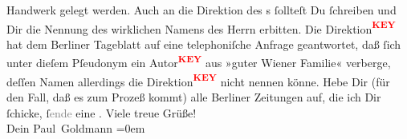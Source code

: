 \begin{ledgroupsized}[t]{13cm}
                    Handwerk gelegt werden. Auch an die {\pb}Direktion
                    des \label{K_L03205-6v}\label{K_L03205-6h}s ſollteſt Du ſchreiben und Dir die Nennung
                    des wirklichen Namens des Herrn \label{K_L03205-7v}\label{K_L03205-7h} erbitten. Die Direktion\textcolor{red}{\textsuperscript{\textbf{KEY}}} hat dem Berliner
                        Tageblatt\strikeout{\textcolor{gray}{×}} auf eine
                    telephoniſche Anfrage geantwortet, daß  ſich
                         unter dieſem Pſeudonym ein Autor\textcolor{red}{\textsuperscript{\textbf{KEY}}} aus »guter Wiener Familie« verberge, deſſen Namen allerdings die Direktion\textcolor{red}{\textsuperscript{\textbf{KEY}}} nicht nennen könne.\pend
           \pstart
           Hebe Dir (für den Fall, daß es zum Prozeß kommt) alle Berliner Zeitungen auf, die ich Dir ſchicke,
                        ſ\textcolor{gray}{ende} eine \label{K_L03205-8v}\label{K_L03205-8h}.\pend
           \pstart
           Viele treue Grüße! {\\[\baselineskip]}Dein \spacefill\mbox{Paul Goldmann}\pend
           \leftskip=0em{}
         
         \endnumbering{}\end{ledgroupsized}\begin{anhang}\end{anhang}\newcommand{\dateiname}{L03205}\newcommand{\titel}{Paul Goldmann an Arthur Schnitzler, 29. 4. [1902]}\newcommand{\editorInnen}{Martin Anton Müller und Laura Untner}
      